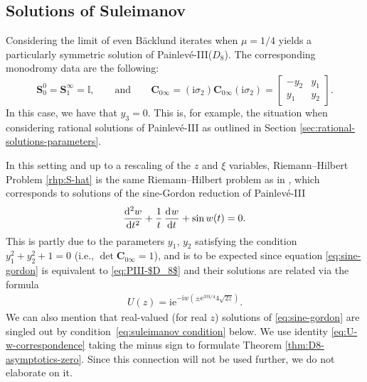 \documentclass[pdftex]{sigma}
\numberwithin{equation}{section}
\newcommand{\ee}{\mathrm{e}}
\newcommand{\ii}{\mathrm{i}}
\begin{document}
\subsection{Solutions of Suleimanov} Considering the limit of even B\"acklund iterates when $\mu = 1/4$ yields a particularly symmetric solution of Painlev\'e-III($D_8$). The corresponding monodromy data are the following:
\[
\mathbf{S}_0^0 = \mathbf{S}_1^\infty = \mathbb{I},
\qquad \text{and} \qquad
\mathbf{C}_{0\infty} = (\ii \sigma_2) \mathbf{C}_{0\infty} (\ii \sigma_2) = \begin{bmatrix}-y_2 & y_1 \\ y_1 & y_2 \end{bmatrix}.
\]
In this case, we have that $y_3 = 0$. This is, for example, the situation when considering rational solutions of Painlev\'e-III as outlined in Section \ref{sec:rational-solutions-parameters}.

\begin{Remark}
In this setting and up to a rescaling of the $z$ and $\xi$ variables, Riemann--Hilbert Problem \ref{rhp:S-hat} is the same Riemann--Hilbert problem as in \cite[Section 13.1]{FIKN}, which corresponds to solutions of the sine-Gordon reduction of Painlev\'e-III
\begin{equation}
\dod[2]{w}{t} + \dfrac{1}{t} \dod{w}{t} + \sin w(t) = 0.
\label{eq:sine-gordon}
\end{equation}
This is partly due to the parameters $y_1$, $y_2$ satisfying the condition $y_1^2 + y_2^2 + 1 = 0$ (i.e., ${\det \mathbf{C}_{0\infty} = 1}$), and is to be expected since equation \eqref{eq:sine-gordon} is equivalent to \eqref{eq:PIII-$D_8$} and their solutions are related via the formula
\begin{gather}
U(z) = \ii \ee^{-\ii w\left(\pm\ee^{3\pi \ii/4}4\sqrt{2z}\right)}.\label{eq:U-w-correspondence}
\end{gather}
We can also mention that real-valued (for real $z$) solutions of \eqref{eq:sine-gordon} are singled out by condition~\eqref{eq:suleimanov condition} below. We use identity \eqref{eq:U-w-correspondence} taking the minus sign to formulate Theorem \ref{thm:D8-asymptotics-zero}. Since this connection will not be used further, we do not elaborate on it.
\end{Remark}
\end{document}
